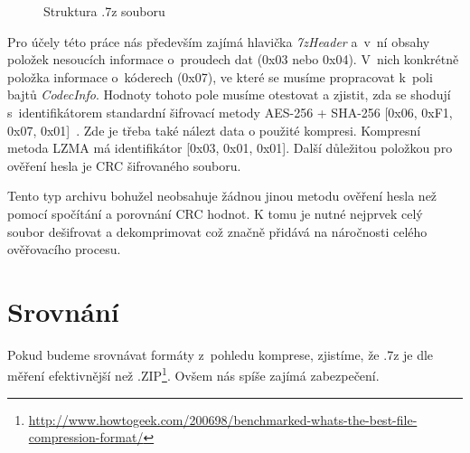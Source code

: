 \begin{figure}[ht]
    \begin{center}
    \end{center}
    \caption{Struktura .7z souboru \cite{Pavlov:2015}}
    \label{7zstruct}
\end{figure}
Pro účely této práce nás především zajímá hlavička {\it 7zHeader} a~v~ní obsahy položek nesoucích
informace o~proudech dat (0x03 nebo 0x04). V~nich konkrétně položka informace o~kóderech (0x07),
ve které se musíme propracovat k~poli bajtů {\it CodecInfo}. Hodnoty tohoto pole musíme otestovat
a zjistit, zda se shodují s~identifikátorem standardní šifrovací metody AES-256 + SHA-256
[0x06, 0xF1, 0x07, 0x01]~\cite{Pavlov:2015}. Zde je třeba také nálezt data o použité kompresi.
Kompresní metoda LZMA má identifikátor [0x03, 0x01, 0x01]. Další důležitou položkou pro ověření hesla je CRC šifrovaného souboru. 

Tento typ archivu bohužel neobsahuje žádnou jinou metodu ověření hesla než pomocí spočítání a
porovnání CRC hodnot. K tomu je nutné nejprvek celý soubor dešifrovat a dekomprimovat což značně
přidává na náročnosti celého ověřovacího procesu.

\section{Srovnání}
Pokud budeme srovnávat formáty z~pohledu komprese, zjistíme, že .7z je dle měření efektivnější
než
.ZIP\footnote{\url{http://www.howtogeek.com/200698/benchmarked-whats-the-best-file-compression-format/}}. Ovšem nás spíše zajímá zabezpečení.

